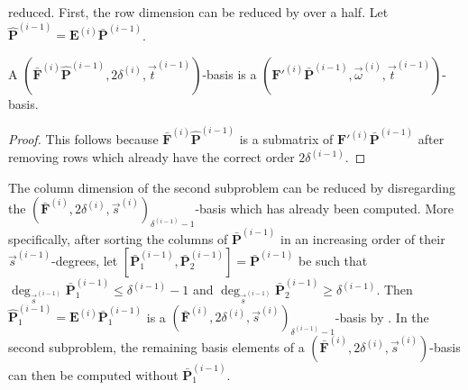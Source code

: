 reduced. First, the row dimension can be reduced by over a half. Let
$\hat{\mathbf{P}}^{\left(i-1\right)}=\mathbf{E}^{\left(i\right)}\bar{\mathbf{P}}^{\left(i-1\right)}$. 
\begin{lem}
\label{lem:simplifySecondSubproblem}A $(\bar{\mathbf{F}}^{\left(i\right)}\hat{\mathbf{P}}^{\left(i-1\right)},2\delta^{\left(i\right)},\vec{t}^{\left(i-1\right)})$-basis
is a $(\mathbf{F}'^{\left(i\right)}\bar{\mathbf{P}}^{\left(i-1\right)},\vec{\omega}^{\left(i\right)},\vec{t}^{\left(i-1\right)})$-basis.\end{lem}
\begin{proof}
This follows because $\bar{\mathbf{F}}^{\left(i\right)}\hat{\mathbf{P}}^{\left(i-1\right)}$
is a submatrix of $\mathbf{F}'^{\left(i\right)}\bar{\mathbf{P}}^{\left(i-1\right)}$
after removing rows which already have the correct order $2\delta^{\left(i-1\right)}$. 
\end{proof}
The column dimension of the second subproblem can be reduced by disregarding
the $(\bar{\mathbf{F}}^{\left(i\right)},2\delta^{\left(i\right)},\vec{s}^{\left(i\right)})_{\delta^{\left(i-1\right)}-1}$-basis
which has already been computed. More specifically, after sorting
the columns of $\bar{\mathbf{P}}^{\left(i-1\right)}$ in an increasing
order of their $\vec{s}^{\left(i-1\right)}$-degrees, let $[\bar{\mathbf{P}}_{1}^{\left(i-1\right)},\bar{\mathbf{P}}_{2}^{\left(i-1\right)}]=\bar{\mathbf{P}}^{\left(i-1\right)}$
be such that $\deg_{\vec{s}^{\left(i-1\right)}}\bar{\mathbf{P}}_{1}^{\left(i-1\right)}\le\delta^{\left(i-1\right)}-1$
and $\deg_{\vec{s}^{\left(i-1\right)}}\bar{\mathbf{P}}_{2}^{\left(i-1\right)}\ge\delta^{\left(i-1\right)}$.
Then $\hat{\mathbf{P}}_{1}^{\left(i-1\right)}=\mathbf{E}^{\left(i\right)}\bar{\mathbf{P}}_{1}^{\left(i-1\right)}$
is a $(\bar{\mathbf{F}}^{\left(i\right)},2\delta^{\left(i\right)},\vec{s}^{\left(i\right)})_{\delta^{\left(i-1\right)}-1}$-basis
by . In the second subproblem,
the remaining basis elements of a $(\bar{\mathbf{F}}^{\left(i\right)},2\delta^{\left(i\right)},\vec{s}^{\left(i\right)})$-basis
can then be computed without $\bar{\mathbf{P}}_{1}^{\left(i-1\right)}$.

